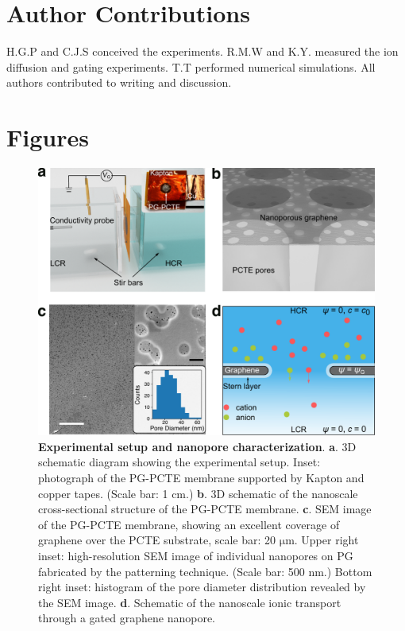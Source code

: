 \documentclass[journal=langd5,email=true, hyperref=true, keywords=false]{achemso}
\begin{document}
\section{Author Contributions}
\label{sec:author}

H.G.P and C.J.S conceived the experiments. R.M.W and K.Y. measured the ion
diffusion and gating experiments. T.T performed numerical
simulations. All authors contributed to writing and discussion.


\section*{}
\label{sec:ref}


\clearpage
\section{Figures}
\label{sec:figs}

\begin{figure}[htbp]
  \centering
  \includegraphics[width=0.95\linewidth]{img/fig1.pdf}
  \caption{\textbf{Experimental setup and nanopore characterization}.
    \textbf{a}. 3D schematic diagram showing the experimental
    setup. Inset: photograph of the PG-PCTE membrane supported by
    Kapton and copper tapes. (Scale bar: 1 cm.) \textbf{b}. 3D schematic
    of the nanoscale cross-sectional structure of the PG-PCTE
    membrane. \textbf{c}. SEM image of the PG-PCTE membrane, showing an
    excellent coverage of graphene over the PCTE substrate, scale bar:
    20 $\mathrm{\mu}$m.  Upper right inset: high-resolution SEM image
    of individual nanopores on PG fabricated by the patterning
    technique. (Scale bar: 500 nm.) Bottom right inset: histogram of the
    pore diameter distribution revealed by the SEM
    image. \textbf{d}. Schematic of the nanoscale ionic transport
    through a gated graphene nanopore.}
  \label{fig:1}
\end{figure}
\end{document}

